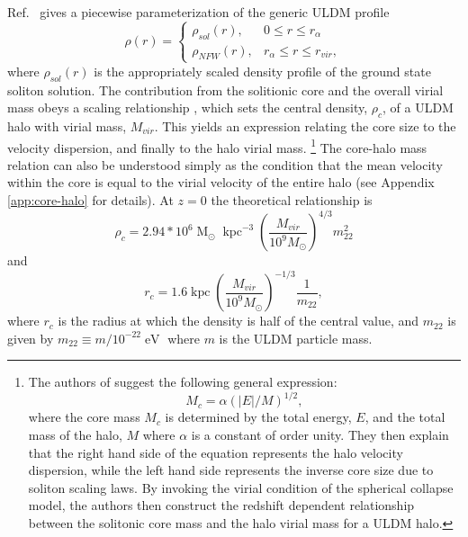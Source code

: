 \documentclass[a4paper,11pt]{article}
\begin{document}
 
Ref.~\cite{Robles:2018fur} gives a piecewise parameterization of the generic ULDM profile 
%
\begin{equation}\label{eq:piecewise}
     \rho(r)=
    \begin{cases}
      \rho_{sol}(r), & 0\leq r \leq r_{\alpha} \\
      \rho_{NFW}(r), & r_{\alpha}\leq r \leq r_{vir},
    \end{cases}
\end{equation}
%
where $\rho_{sol}(r)$ is the appropriately scaled density profile of the ground state soliton solution. The contribution from the solitionic core and the overall virial mass  obeys a scaling relationship \cite{Schive:2014hza}, which sets the  central density, $\rho_c$, of a ULDM halo with virial mass, $M_{vir}$.  This yields an expression relating the core size to the velocity dispersion, and finally to the halo virial mass.%
\footnote{The authors of \cite{Schive:2014hza} suggest the following general expression:
\begin{equation}
    M_c = \alpha \left(\vert E\vert/M\right)^{1/2},
\end{equation}
where the core mass $M_c$ is determined by the total energy, $E$, and the total mass of the halo, $M$ where $\alpha$ is a constant of order unity. They then explain that the right hand side of the equation represents the halo velocity dispersion, while the left hand side  represents the inverse core size due to soliton scaling laws. By invoking the virial condition of the spherical collapse model, the authors then  construct the redshift dependent relationship between the solitonic core mass and the halo virial mass for a ULDM halo.}
%
The core-halo mass relation can also be understood simply as the condition that the mean velocity within the core is equal to the virial velocity of the entire halo (see Appendix \ref{app:core-halo} for details). 
At $z=0$ the theoretical relationship is \cite{Schive:2014hza} 
%
\begin{equation}\label{eq:central_dens}
    \rho_c = 2.94*10^6 \operatorname{M}_{\odot}\operatorname{kpc}^{-3}\left(\frac{M_{vir}}{10^9 M_{\odot}}\right)^{4/3}m_{22}^{2}
\end{equation}
and 
\begin{equation}
    r_c = 1.6 \operatorname{kpc}\left(\frac{M_{vir}}{10^9 M_{\odot}}\right)^{-1/3}\frac{1}{m_{22}},
\end{equation}
%
where $r_c$ is the radius at which the density is half of the central value, and $m_{22}$ is given by $m_{22} \equiv m / 10^{-22} \operatorname{eV}$ where $m$ is the ULDM particle mass. 
\end{document}
